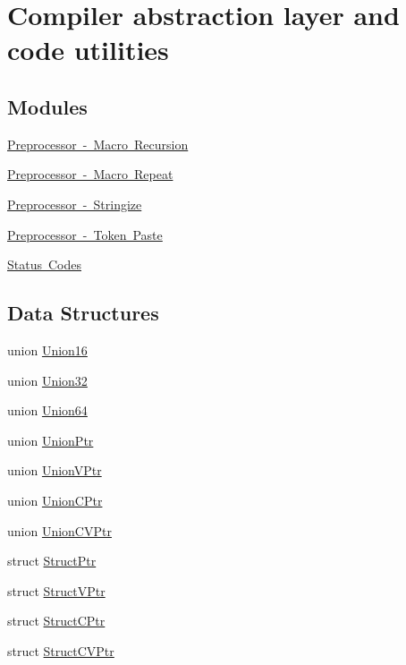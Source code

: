 \hypertarget{group__group__sam0__utils}{}\section{Compiler abstraction layer and code utilities}
\label{group__group__sam0__utils}
\subsection*{Modules}
\begin{DoxyCompactItemize}
\item 
\mbox{\hyperlink{group__group__sam0__utils__mrecursion}{Preprocessor -\/ Macro Recursion}}
\item 
\mbox{\hyperlink{group__group__sam0__utils__mrepeat}{Preprocessor -\/ Macro Repeat}}
\item 
\mbox{\hyperlink{group__group__sam0__utils__stringz}{Preprocessor -\/ Stringize}}
\item 
\mbox{\hyperlink{group__group__sam0__utils__tpaste}{Preprocessor -\/ Token Paste}}
\item 
\mbox{\hyperlink{group__group__sam0__utils__status__codes}{Status Codes}}
\end{DoxyCompactItemize}
\subsection*{Data Structures}
\begin{DoxyCompactItemize}
\item 
union \mbox{\hyperlink{union_union16}{Union16}}
\item 
union \mbox{\hyperlink{union_union32}{Union32}}
\item 
union \mbox{\hyperlink{union_union64}{Union64}}
\item 
union \mbox{\hyperlink{union_union_ptr}{Union\+Ptr}}
\item 
union \mbox{\hyperlink{union_union_v_ptr}{Union\+V\+Ptr}}
\item 
union \mbox{\hyperlink{union_union_c_ptr}{Union\+C\+Ptr}}
\item 
union \mbox{\hyperlink{union_union_c_v_ptr}{Union\+C\+V\+Ptr}}
\item 
struct \mbox{\hyperlink{struct_struct_ptr}{Struct\+Ptr}}
\item 
struct \mbox{\hyperlink{struct_struct_v_ptr}{Struct\+V\+Ptr}}
\item 
struct \mbox{\hyperlink{struct_struct_c_ptr}{Struct\+C\+Ptr}}
\item 
struct \mbox{\hyperlink{struct_struct_c_v_ptr}{Struct\+C\+V\+Ptr}}
\end{DoxyCompactItemize}
